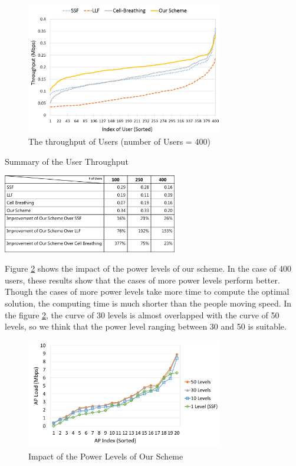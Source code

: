 \begin{figure}[tbp]
\begin{center}
\includegraphics[width=3.4in]{images/Average_user_throughput.png}
\end{center}
\caption{The throughput of Users (number of Users = 400)}
\label{fig:Average-user-throughput}
\end{figure}

\begin{table}[tbp]
\setlength{\belowcaptionskip}{20 pt}
\centering
\caption{Summary of the User Throughput}
\label{tab:Average-user-throughput}
\includegraphics[width=3in]{images/table4_4.png}
\end{table}

Figure \ref{fig:Levels} shows the impact of the power levels of our scheme. In the case of 400 users, these results show that the cases of more power levels perform better. Though the cases of more power levels take more time to compute the optimal solution, the computing time is much shorter than the people moving speed. In the figure \ref{fig:Levels}, the curve of 30 levels is almost overlapped with the curve of 50 levels, so we think that the power level ranging between 30 and 50 is suitable.

\begin{figure}[tbp]
\begin{center}
\includegraphics[width=3.4in]{images/Levels.png}
\end{center}
\caption{Impact of the Power Levels of Our Scheme}
\label{fig:Levels}
\end{figure}

